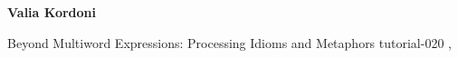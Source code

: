 \begin{bio}
  {\bfseries Valia Kordoni}


\end{bio}

\begin{tutorial}
  {Beyond Multiword Expressions: Processing Idioms and Metaphors}
  {tutorial-020}
  {\daydateyear, \tutorialafternoontime}
  {\TutLocE}


\end{tutorial}
